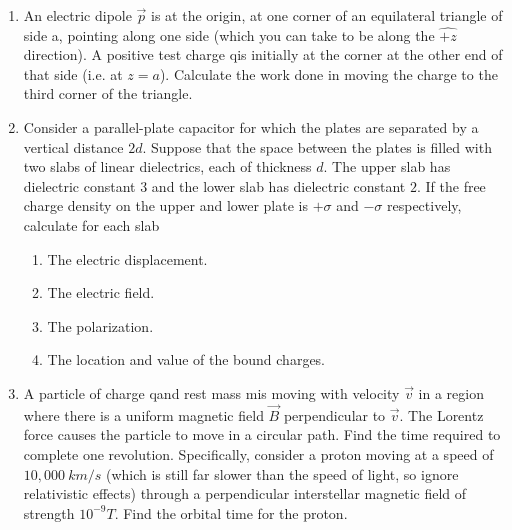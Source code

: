 \documentclass[fleqn]{article}
\begin{document}
\begin{enumerate}
    \item An electric dipole $\overrightarrow{p}$ is at the origin, at one corner of an equilateral triangle of side a, pointing 
    along one side (which you can take to be along the $\hat{+z}$ direction). A positive test charge qis initially at the corner at 
    the other end of that side (i.e. at $z=a$). Calculate the work done in moving the charge to the third corner of the triangle.


    \item Consider a parallel-plate capacitor for which the plates are separated by a vertical distance $2d$. Suppose that the 
    space between the plates is filled with two slabs of linear dielectrics, each of thickness $d$. The upper slab has dielectric 
    constant $3$ and the lower slab has dielectric constant $2$. If the free charge density on the upper and lower plate is
    $+\sigma$ and $-\sigma$ respectively, calculate for each slab
    \begin{enumerate}
      \item The electric displacement.


      \item The electric field.


      \item The polarization.


      \item The location and value of the bound charges.

  
    \end{enumerate}

    \item A particle of charge qand rest mass mis moving with velocity $\overrightarrow{v}$ in a region where there 
    is a uniform magnetic field $\overrightarrow{B}$ perpendicular to $\overrightarrow{v}$. The Lorentz force causes 
    the particle to move in a circular path. Find the time required to complete one revolution. Specifically, consider
    a proton moving at a speed of $10,000 ~ km/s$ (which is still far slower than the speed of light, so ignore relativistic 
    effects) through a perpendicular interstellar magnetic field of strength $10^{-9} T$. Find the orbital time for the proton.


\end{enumerate}
\end{document}
